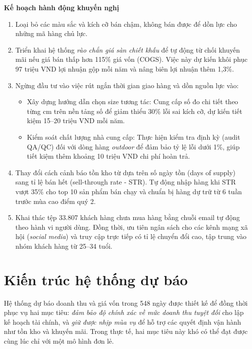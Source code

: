 \documentclass{article}
\begin{document}
\textbf{Kế hoạch hành động khuyến nghị}

\begin{enumerate}[noitemsep,leftmargin=1.2em]
    \item Loại bỏ các màu sắc và kích cỡ bán chậm, không bán được để dồn lực cho những mã hàng chủ lực. 
    \item Triển khai hệ thống \textit{rào chắn giá sàn chiết khấu} để tự động từ chối khuyến mãi nếu giá bán thấp hơn 115\% giá vốn (COGS). Việc này dự kiến khôi phục 97 triệu VND lợi nhuận gộp mỗi năm và nâng biên lợi nhuận thêm 1,3\%.   
    \item Ngừng đầu tư vào việc rút ngắn thời gian giao hàng và dồn nguồn lực vào:
    
    \begin{itemize}
        \item Xây dựng hướng dẫn chọn size tương tác: Cung cấp số đo chi tiết theo từng cm trên nền tảng số để giảm thiểu 30\% lỗi sai kích cỡ, dự kiến tiết kiệm 15–20 triệu VND mỗi năm.
        \item Kiểm soát chất lượng nhà cung cấp: Thực hiện kiểm tra định kỳ (audit QA/QC) đối với dòng hàng \textit{outdoor} để đảm bảo tỷ lệ lỗi dưới 1\%, giúp tiết kiệm thêm khoảng 10 triệu VND chi phí hoàn trả.
    \end{itemize}

    \item Thay đổi cách cảnh báo tồn kho từ dựa trên số ngày tồn (days of supply) sang tỉ lệ bán hết (sell-through rate - STR). Tự động nhập hàng khi STR vượt 35\% cho top 10 sản phẩm bán chạy và chuẩn bị hàng dự trữ từ 6 tuần trước mùa cao điểm quý 2.
    \item Khai thác tệp 33.807 khách hàng chưa mua hàng bằng chuỗi email tự động theo hành vi người dùng. Đồng thời, ưu tiên ngân sách cho các kênh mạng xã hội (\textit{social media}) và truy cập trực tiếp có tỉ lệ chuyển đổi cao, tập trung vào nhóm khách hàng từ 25–34 tuổi.
\end{enumerate}


\section{Kiến trúc hệ thống dự báo}
\label{sec:modeling}

Hệ thống dự báo doanh thu và giá vốn trong 548 ngày được thiết kế để đồng thời phục vụ hai mục tiêu: \textit{đảm bảo độ chính xác về mức doanh thu tuyệt đối} cho lập kế hoạch tài chính, và \textit{giữ được nhịp mùa vụ} để hỗ trợ các quyết định vận hành như tồn kho và khuyến mãi. Trong thực tế, hai mục tiêu này khó có thể đạt được cùng lúc chỉ với một mô hình đơn lẻ.
\end{document}
